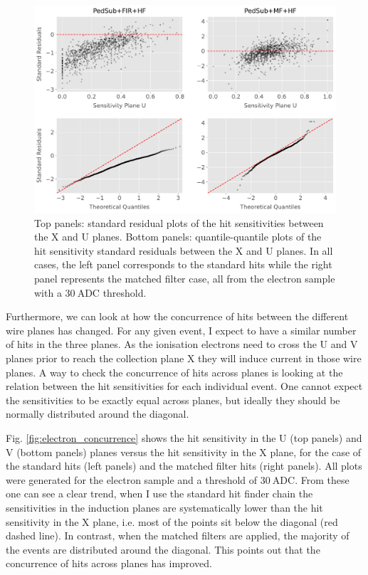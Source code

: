\begin{figure}[t]
	\centering
	\includegraphics[width=.99\linewidth]{Images/Matched_Filter/hit_study_electron_residuals}
	\caption[Standard residuals and quantile-quantile plots for the hit sensitivity of the X and U planes.]{Top panels: standard residual plots of the hit sensitivities between the X and U planes. Bottom panels: quantile-quantile plots of the hit sensitivity standard residuals between the X and U planes. In all cases, the left panel corresponds to the standard hits while the right panel represents the matched filter case, all from the electron sample with a $30 \ \mathrm{ADC}$ threshold.}
	\label{fig:electron_residuals}
\end{figure}

Furthermore, we can look at how the concurrence of hits between the different wire planes has changed. For any given event, I expect to have a similar number of hits in the three planes. As the ionisation electrons need to cross the U and V planes prior to reach the collection plane X they will induce current in those wire planes. A way to check the concurrence of hits across planes is looking at the relation between the hit sensitivities for each individual event. One cannot expect the sensitivities to be exactly equal across planes, but ideally they should be normally distributed around the diagonal.

Fig. \ref{fig:electron_concurrence} shows the hit sensitivity in the U (top panels) and V (bottom panels) planes versus the hit sensitivity in the X plane, for the case of the standard hits (left panels) and the matched filter hits (right panels). All plots were generated for the electron sample and a threshold of $30 \ \mathrm{ADC}$. From these one can see a clear trend, when I use the standard hit finder chain the sensitivities in the induction planes are systematically lower than the hit sensitivity in the X plane, i.e. most of the points sit below the diagonal (red dashed line). In contrast, when the matched filters are applied, the majority of the events are distributed around the diagonal. This points out that the concurrence of hits across planes has improved.

